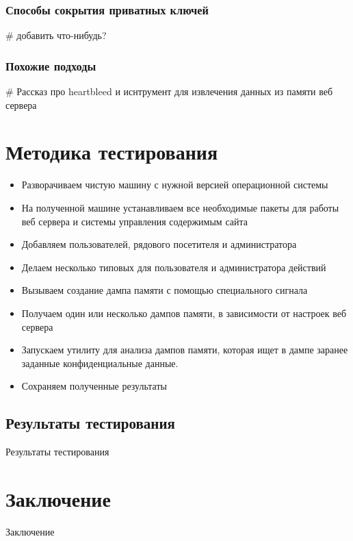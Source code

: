 \documentclass[20pt]{article}
\begin{document}
\subsubsection{Способы сокрытия приватных ключей}
\# добавить что-нибудь?

\subsubsection{Похожие подходы}
\# Рассказ про heartbleed и иснтрумент для извлечения данных из памяти веб сервера

\newpage

\section{Методика тестирования}
\begin{itemize}
  \item Разворачиваем чистую машину с нужной версией операционной системы
  \item На полученной машине устанавливаем все необходимые пакеты для работы
  веб сервера и системы управления содержимым сайта
  \item Добавляем пользователей, рядового посетителя и администратора
  \item Делаем несколько типовых для пользователя и администратора действий
  \item Вызываем создание дампа памяти с помощью специального сигнала
  \item Получаем один или несколько дампов памяти, в зависимости от настроек
  веб сервера
  \item Запускаем утилиту для анализа дампов памяти, которая ищет в дампе
  заранее заданные конфиденциальные данные.
  \item Сохраняем полученные результаты
\end{itemize}

\subsection{Результаты тестирования}
Результаты тестирования

\newpage

\section{Заключение}
Заключение



\end{document}
